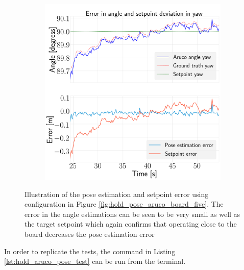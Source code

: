 \documentclass[../Head/report.tex]{subfiles}
\begin{document}
\begin{figure}[H]
\begin{subfigure}[t]{.30\textwidth}
        \caption{}
        \label{fig:hold_pose_estimation_test5_pitch}
    \end{subfigure}
     \hspace{0.2em}
    \begin{subfigure}[t]{.30\textwidth}
        \centering
        \includegraphics[width=\textwidth]{../Figures/hold_pose_using_aruco_pose_estimation/test5_landingBoard3_noWind/error_yaw/pose_error_yaw_test1.png}
        \caption{}
        \label{fig:hold_pose_estimation_test5_yaw}
    \end{subfigure}
    \caption{Illustration of the pose estimation and setpoint error using configuration in Figure \ref{fig:hold_pose_aruco_board_five}. The error in the angle estimations can be seen to be very small as well as the target setpoint which again confirms that operating close to the board decreases the pose estimation error}
    \label{fig:hold_pose_estimation_test5_error_angle}
\end{figure}

In order to replicate the tests, the command in Listing \ref{lst:hold_aruco_pose_test} can be run from the terminal.
\end{document}
